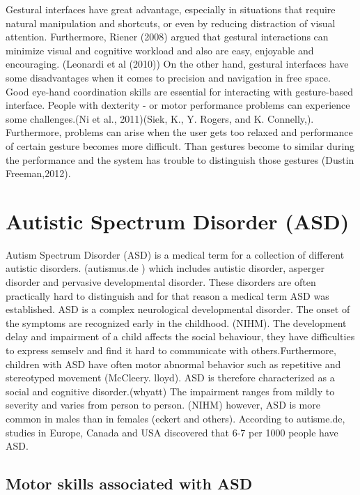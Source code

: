 \newline
Gestural interfaces have great advantage, especially in situations that require natural manipulation and shortcuts, or even by reducing distraction of visual attention. Furthermore, Riener (2008) argued that gestural interactions can minimize visual and cognitive workload and also are easy, enjoyable and encouraging. (Leonardi et al (2010)) On the other hand, gestural interfaces have some disadvantages when it comes to precision and navigation in free space. Good eye-hand coordination skills are essential for interacting with gesture-based interface. People with dexterity - or motor performance problems can experience some challenges.(Ni et al., 2011)(Siek, K., Y. Rogers, and K. Connelly,). Furthermore, problems can arise when the user gets too relaxed and performance of certain gesture becomes more difficult. Than gestures become to similar during the performance and the system has trouble to distinguish those gestures (Dustin Freeman,2012).
\newline


\section{Autistic Spectrum Disorder (ASD)}
\label{sec:asd}

Autism Spectrum Disorder (ASD) is a medical term for a collection of different autistic disorders. (autismus.de ) which includes autistic disorder, asperger disorder and pervasive developmental disorder. These disorders are often practically hard to distinguish and for that reason a medical term ASD was established.  ASD is a complex neurological developmental disorder. The onset of the symptoms are recognized early in the childhood. (NIHM). The development delay and impairment of a child affects the social behaviour, they have difficulties to express semselv and find it hard to communicate with others.Furthermore, children with ASD have often motor abnormal behavior such as repetitive and stereotyped movement (McCleery. lloyd).  ASD is therefore characterized as a social and cognitive disorder.(whyatt) The impairment ranges from mildly to severity and varies from person to person. (NIHM) however, ASD is more common in males than in females (eckert and others). According to autisme.de, studies in Europe, Canada and USA discovered that 6-7 per 1000 people have ASD. 



\subsection{Motor skills associated with ASD}

